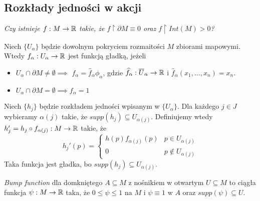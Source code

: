 \subsection{Rozkłady jedności w akcji}

\emph{Czy istnieje $f:M\to\mathbb{R}$ takie, że $f\restriction\partial M\equiv 0$ oraz $f\restriction Int(M)>0$?}

Niech $\{U_\alpha\}$ będzie dowolnym pokryciem rozmaitości $M$ zbiorami mapowymi. Wtedy $f_\alpha:U_\alpha\to\mathbb{R}$ jest funkcją gładką, jeżeli
\begin{itemize}
    \item $U_\alpha\cap\partial M\neq\emptyset\implies$ $f_\alpha=\hat{f}_\alpha\phi_\alpha$, gdzie $\widehat{f}_\alpha:\overline U_\alpha\to \mathbb{R}$ i $\hat{f}_\alpha(x_1,...,x_n)=x_n$.
    \item $U_\alpha\cap\partial M=\emptyset\implies f_\alpha=1$
\end{itemize}
Niech $\{h_j\}$ będzie rozkładem jedności wpisanym w $\{U_\alpha\}$. Dla każdego $j\in J$ wybieramy $\alpha(j)$ takie, że $supp(h_j)\subseteq U_{\alpha(j)}$. Definiujemy wtedy $h_j'=h_j\circ f_{\alpha(j)}:M\to\mathbb{R}$ takie, że
$$h_j'(p)=
\left\{\begin{matrix}
h(p)f_{\alpha(j)}(p) & p\in U_{\alpha(j)}\\
0 & p\notin U_{\alpha(j)}
\end{matrix}\right.
$$
Taka funkcja jest gładka, bo $supp(h_j)\subseteq U_{\alpha(j)}$.

\emph{Bump function} dla domkniętego $A\subseteq M$ z nośnikiem w otwartym $U\subseteq M$ to ciągła funkcja $\psi:M\to\mathbb{R}$ taka, że $0\leq\psi\leq1$ na $M$ i $\psi\equiv 1$ w $A$ oraz $supp(\psi)\subseteq U$.


















